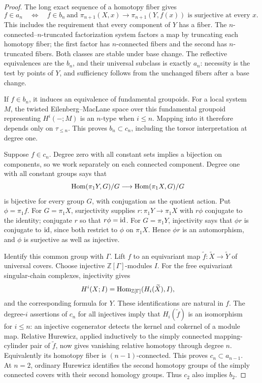 \begin{proof}
The long exact sequence of a homotopy fiber gives
\[
 f\in a_n\quad\Longleftrightarrow\quad
 f\in b_n\ \text{and }\pi_{n+1}(X,x)\to\pi_{n+1}(Y,f(x))
 \text{ is surjective at every }x.
\]
This includes the requirement that every component of $Y$
has a fiber. The $n$-connected--$n$-truncated factorization
system factors a map by truncating each homotopy fiber;
the first factor has $n$-connected fibers and the second
has $n$-truncated fibers. Both classes are stable under
base change. The reflective equivalences are the $b_n$,
and their universal subclass is exactly $a_n$: necessity
is the test by points of $Y$, and sufficiency follows from
the unchanged fibers after a base change.

If $f\in b_n$, it induces an equivalence of fundamental
groupoids. For a local system $M$, the twisted
Eilenberg--MacLane space over this fundamental groupoid
representing $H^i(-;M)$ is an $n$-type when $i\leq n$.
Mapping into it therefore depends only on $\tau_{\leq n}$.
This proves $b_n\subset c_n$, including the torsor
interpretation at degree one.

Suppose $f\in c_n$. Degree zero with all constant sets
implies a bijection on components, so we work separately
on each connected component. Degree one with all constant
groups says that
\[
 \operatorname{Hom}(\pi_1Y,G)/G\longrightarrow\operatorname{Hom}(\pi_1X,G)/G
\]
is bijective for every group $G$, with conjugation as the
quotient action. Put $\phi=\pi_1f$. For $G=\pi_1X$,
surjectivity supplies $r:\pi_1Y\to\pi_1X$ with
$r\phi$ conjugate to the identity; conjugate $r$ so that
$r\phi=\mathrm{id}$. For $G=\pi_1Y$, injectivity says that
$\phi r$ is conjugate to $\mathrm{id}$, since both restrict to
$\phi$ on $\pi_1X$. Hence $\phi r$ is an automorphism,
and $\phi$ is surjective as well as injective.

Identify this common group with $\Gamma$. Lift $f$ to an
equivariant map $\widetilde f:\widetilde X\to\widetilde Y$
of universal covers. Choose injective $\mathbb Z[\Gamma]$-modules
$I$. For the free equivariant singular-chain complexes,
injectivity gives
\[
 H^i(X;I)=\operatorname{Hom}_{\mathbb Z[\Gamma]}(H_i(\widetilde X),I),
\]
and the corresponding formula for $Y$. These identifications
are natural in $f$. The degree-$i$ assertions of $c_n$ for
all injectives imply that $H_i(\widetilde f)$ is an
isomorphism for $i\leq n$: an injective cogenerator detects
the kernel and cokernel of a module map. Relative Hurewicz,
applied inductively to the simply connected mapping-cylinder
pair of $\widetilde f$, now gives vanishing relative
homotopy through degree $n$. Equivalently its homotopy
fiber is $(n-1)$-connected. This proves $c_n\subset a_{n-1}$.
At $n=2$, ordinary Hurewicz identifies the second homotopy
groups of the simply connected covers with their second
homology groups. Thus $c_2$ also implies $b_2$.


\end{proof}
